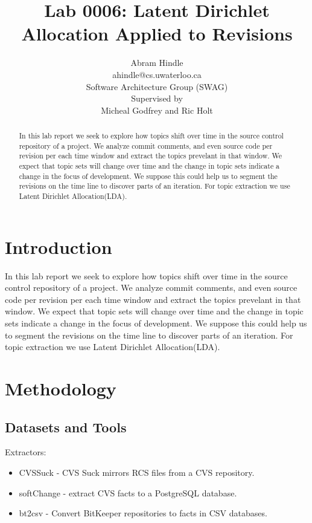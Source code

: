 \documentclass{report}
\author{Abram Hindle\\
ahindle@cs.uwaterloo.ca\\
Software Architecture Group (SWAG)\\
Supervised by\\
Micheal Godfrey and Ric Holt
}
\title{Lab 0006: Latent Dirichlet Allocation Applied to Revisions}
\newcommand{\lda}{Latent Dirichlet Allocation}
\begin{document}
\maketitle
\begin{abstract}

  In this lab report we seek to explore how topics shift over time in
  the source control repository of a project. We analyze commit
  comments, and even source code per revision per each time window and
  extract the topics prevelant in that window. We expect that topic
  sets will change over time and the change in topic sets indicate a
  change in the focus of development. We suppose this could help us to
  segment the revisions on the time line to discover parts of an
  iteration. For topic extraction we use \lda (LDA).

\end{abstract}

\section{Introduction}


In this lab report we seek to explore how topics shift over time in
the source control repository of a project. We analyze commit
comments, and even source code per revision per each time window and
extract the topics prevelant in that window. We expect that topic sets
will change over time and the change in topic sets indicate a change
in the focus of development. We suppose this could help us to segment
the revisions on the time line to discover parts of an iteration. For
topic extraction we use \lda (LDA).

\section{Methodology}

\subsection{Datasets and Tools}

Extractors:
\begin{itemize}
\item CVSSuck - CVS Suck mirrors RCS files from a CVS repository. 
\item softChange - extract CVS facts to a PostgreSQL database.
\item bt2csv - Convert BitKeeper repositories to facts in CSV
  databases.
\end{itemize}
\end{document}
